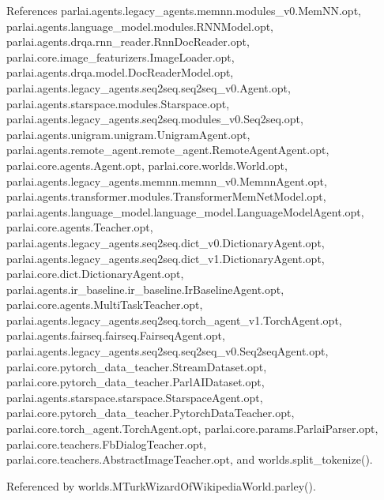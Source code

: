 References parlai.\+agents.\+legacy\+\_\+agents.\+memnn.\+modules\+\_\+v0.\+Mem\+N\+N.\+opt, parlai.\+agents.\+language\+\_\+model.\+modules.\+R\+N\+N\+Model.\+opt, parlai.\+agents.\+drqa.\+rnn\+\_\+reader.\+Rnn\+Doc\+Reader.\+opt, parlai.\+core.\+image\+\_\+featurizers.\+Image\+Loader.\+opt, parlai.\+agents.\+drqa.\+model.\+Doc\+Reader\+Model.\+opt, parlai.\+agents.\+legacy\+\_\+agents.\+seq2seq.\+seq2seq\+\_\+v0.\+Agent.\+opt, parlai.\+agents.\+starspace.\+modules.\+Starspace.\+opt, parlai.\+agents.\+legacy\+\_\+agents.\+seq2seq.\+modules\+\_\+v0.\+Seq2seq.\+opt, parlai.\+agents.\+unigram.\+unigram.\+Unigram\+Agent.\+opt, parlai.\+agents.\+remote\+\_\+agent.\+remote\+\_\+agent.\+Remote\+Agent\+Agent.\+opt, parlai.\+core.\+agents.\+Agent.\+opt, parlai.\+core.\+worlds.\+World.\+opt, parlai.\+agents.\+legacy\+\_\+agents.\+memnn.\+memnn\+\_\+v0.\+Memnn\+Agent.\+opt, parlai.\+agents.\+transformer.\+modules.\+Transformer\+Mem\+Net\+Model.\+opt, parlai.\+agents.\+language\+\_\+model.\+language\+\_\+model.\+Language\+Model\+Agent.\+opt, parlai.\+core.\+agents.\+Teacher.\+opt, parlai.\+agents.\+legacy\+\_\+agents.\+seq2seq.\+dict\+\_\+v0.\+Dictionary\+Agent.\+opt, parlai.\+agents.\+legacy\+\_\+agents.\+seq2seq.\+dict\+\_\+v1.\+Dictionary\+Agent.\+opt, parlai.\+core.\+dict.\+Dictionary\+Agent.\+opt, parlai.\+agents.\+ir\+\_\+baseline.\+ir\+\_\+baseline.\+Ir\+Baseline\+Agent.\+opt, parlai.\+core.\+agents.\+Multi\+Task\+Teacher.\+opt, parlai.\+agents.\+legacy\+\_\+agents.\+seq2seq.\+torch\+\_\+agent\+\_\+v1.\+Torch\+Agent.\+opt, parlai.\+agents.\+fairseq.\+fairseq.\+Fairseq\+Agent.\+opt, parlai.\+agents.\+legacy\+\_\+agents.\+seq2seq.\+seq2seq\+\_\+v0.\+Seq2seq\+Agent.\+opt, parlai.\+core.\+pytorch\+\_\+data\+\_\+teacher.\+Stream\+Dataset.\+opt, parlai.\+core.\+pytorch\+\_\+data\+\_\+teacher.\+Parl\+A\+I\+Dataset.\+opt, parlai.\+agents.\+starspace.\+starspace.\+Starspace\+Agent.\+opt, parlai.\+core.\+pytorch\+\_\+data\+\_\+teacher.\+Pytorch\+Data\+Teacher.\+opt, parlai.\+core.\+torch\+\_\+agent.\+Torch\+Agent.\+opt, parlai.\+core.\+params.\+Parlai\+Parser.\+opt, parlai.\+core.\+teachers.\+Fb\+Dialog\+Teacher.\+opt, parlai.\+core.\+teachers.\+Abstract\+Image\+Teacher.\+opt, and worlds.\+split\+\_\+tokenize().



Referenced by worlds.\+M\+Turk\+Wizard\+Of\+Wikipedia\+World.\+parley().

